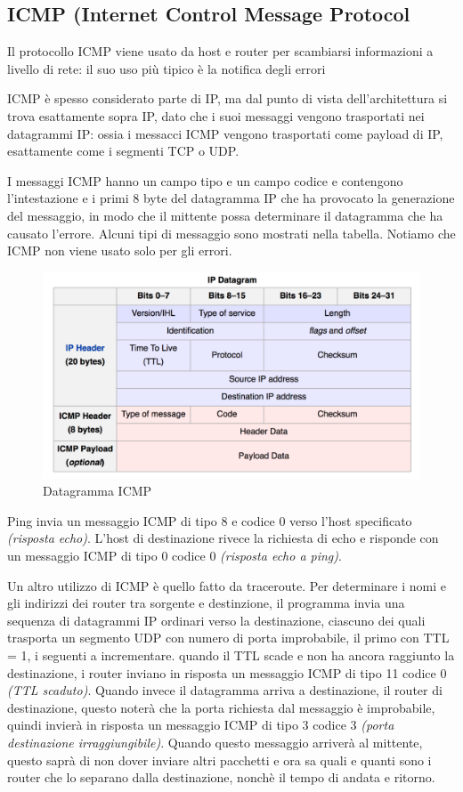 \documentclass[11pt,a4paper]{article}
\begin{document}
\subsection{ICMP (Internet Control Message Protocol}
Il protocollo ICMP viene usato da host e router per scambiarsi informazioni a livello di rete: il suo uso più tipico è la notifica degli errori

ICMP è spesso considerato parte di IP, ma dal punto di vista dell'architettura si trova esattamente sopra IP, dato che i suoi messaggi vengono trasportati nei datagrammi IP: ossia i messacci ICMP vengono trasportati come payload di IP, esattamente come i segmenti TCP o UDP.

I messaggi ICMP hanno un campo tipo e un campo codice e contengono l'intestazione e i primi 8 byte del datagramma IP che ha provocato la generazione del messaggio, in modo che il mittente possa determinare il datagramma che ha causato l'errore. Alcuni tipi di messaggio sono mostrati nella tabella. Notiamo che ICMP non viene usato solo per gli errori.
\begin{figure}
	\begin{center}
		\includegraphics[scale=0.23]{img/068.png}
		\caption{Datagramma ICMP}
		\label{fig: 068}
	\end{center}
\end{figure}

Ping invia un messaggio ICMP di tipo 8 e codice 0 verso l'host specificato \textit{(risposta echo)}. L'host di destinazione rivece la richiesta di echo e risponde con un messaggio ICMP di tipo 0 codice 0 \textit{(risposta echo a ping)}.

Un altro utilizzo di ICMP è quello fatto da traceroute. Per determinare i nomi e gli indirizzi dei router tra sorgente e destinzione, il programma invia una sequenza di datagrammi IP ordinari verso la destinazione, ciascuno dei quali trasporta un  segmento UDP con numero di porta improbabile, il primo con TTL = 1, i seguenti a incrementare. quando il TTL scade e non ha ancora raggiunto la destinazione, i router inviano in risposta un messaggio ICMP di tipo 11 codice 0 \textit{(TTL scaduto)}. Quando invece il datagramma arriva a destinazione, il router di destinazione, questo noterà che la porta richiesta dal messaggio è improbabile, quindi invierà in risposta un messaggio ICMP di tipo 3 codice 3 \textit{(porta destinazione irraggiungibile)}. Quando questo messaggio arriverà al mittente, questo saprà di non dover inviare altri pacchetti e ora sa quali e quanti sono i router che lo separano dalla destinazione, nonchè il tempo di andata e ritorno.
\end{document}
